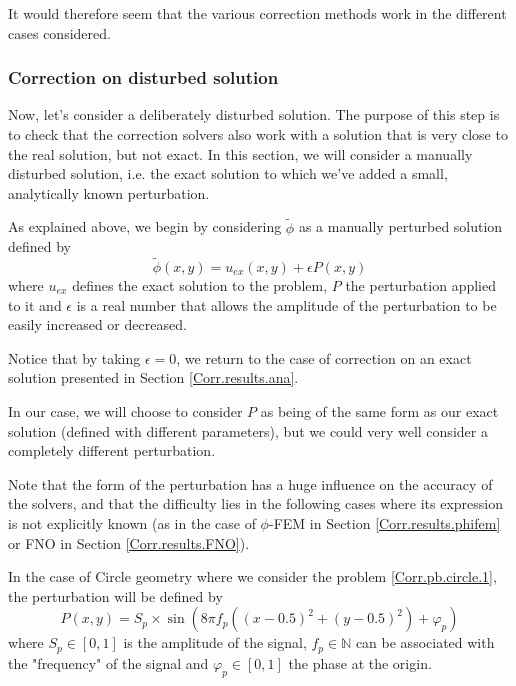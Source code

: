 It would therefore seem that the various correction methods work in the different cases considered.

\subsubsection{Correction on disturbed solution} \label{Corr.results.disturbed}

Now, let's consider a deliberately disturbed solution. The purpose of this step is to check that the correction solvers also work with a solution that is very close to the real solution, but not exact. In this section, we will consider a manually disturbed solution, i.e. the exact solution to which we've added a small, analytically known perturbation.

As explained above, we begin by considering $\tilde{\phi}$ as a manually perturbed solution defined by
\begin{equation*}
	\tilde{\phi}(x,y)=u_{ex}(x,y)+\epsilon P(x,y)
\end{equation*}
where $u_{ex}$ defines the exact solution to the problem, $P$ the perturbation applied to it and $\epsilon$ is a real number that allows the amplitude of the perturbation to be easily increased or decreased. 

\begin{Rem}
	Notice that by taking $\epsilon=0$, we return to the case of correction on an exact solution presented in Section \ref{Corr.results.ana}. 
\end{Rem}

In our case, we will choose to consider $P$ as being of the same form as our exact solution (defined with different parameters), but we could very well consider a completely different perturbation. 

\begin{Rem}
	Note that the form of the perturbation has a huge influence on the accuracy of the solvers, and that the difficulty lies in the following cases where its expression is not explicitly known (as in the case of $\phi$-FEM in Section \ref{Corr.results.phifem} or FNO in Section \ref{Corr.results.FNO}).
\end{Rem}

In the case of Circle geometry where we consider the problem \ref{Corr.pb.circle.1}, the perturbation will be defined by
\begin{equation*}
	P(x,y)=S_p\times\sin\left(8\pi f_p\left((x-0.5)^2+(y-0.5)^2\right)+\varphi_p\right)
\end{equation*}
where $S_p\in[0,1]$ is the amplitude of the signal, $f_p\in\mathbb{N}$ can be associated with the "frequency" of the signal and $\varphi_p\in[0,1]$ the phase at the origin.

